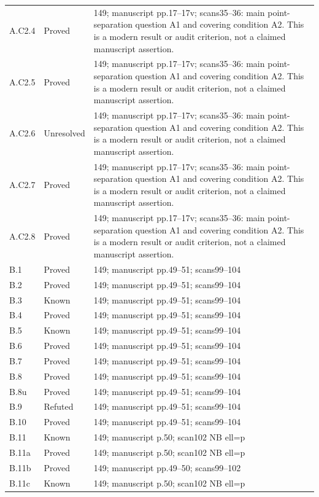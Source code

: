 {\begin{longtable}{p{1.9cm}p{1.7cm}p{10.3cm}}
A.C2.4 & Proved & 149; manuscript pp.17–17v; scans35–36: main point-separation question A1 and covering condition A2. This is a modern result or audit criterion, not a claimed manuscript assertion. \\
A.C2.5 & Proved & 149; manuscript pp.17–17v; scans35–36: main point-separation question A1 and covering condition A2. This is a modern result or audit criterion, not a claimed manuscript assertion. \\
A.C2.6 & Unresolved & 149; manuscript pp.17–17v; scans35–36: main point-separation question A1 and covering condition A2. This is a modern result or audit criterion, not a claimed manuscript assertion. \\
A.C2.7 & Proved & 149; manuscript pp.17–17v; scans35–36: main point-separation question A1 and covering condition A2. This is a modern result or audit criterion, not a claimed manuscript assertion. \\
A.C2.8 & Proved & 149; manuscript pp.17–17v; scans35–36: main point-separation question A1 and covering condition A2. This is a modern result or audit criterion, not a claimed manuscript assertion. \\
B.1 & Proved & 149; manuscript pp.49–51; scans99–104 \\
B.2 & Proved & 149; manuscript pp.49–51; scans99–104 \\
B.3 & Known & 149; manuscript pp.49–51; scans99–104 \\
B.4 & Proved & 149; manuscript pp.49–51; scans99–104 \\
B.5 & Known & 149; manuscript pp.49–51; scans99–104 \\
B.6 & Proved & 149; manuscript pp.49–51; scans99–104 \\
B.7 & Proved & 149; manuscript pp.49–51; scans99–104 \\
B.8 & Proved & 149; manuscript pp.49–51; scans99–104 \\
B.8u & Proved & 149; manuscript pp.49–51; scans99–104 \\
B.9 & Refuted & 149; manuscript pp.49–51; scans99–104 \\
B.10 & Proved & 149; manuscript pp.49–51; scans99–104 \\
B.11 & Known & 149; manuscript p.50; scan102 NB ell=p \\
B.11a & Proved & 149; manuscript p.50; scan102 NB ell=p \\
B.11b & Proved & 149; manuscript pp.49–50; scans99–102 \\
B.11c & Known & 149; manuscript p.50; scan102 NB ell=p \\

\end{longtable}}
